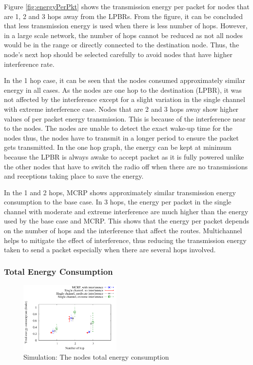 Figure \ref{fig:energyPerPkt} shows the transmission energy per packet for nodes that are 1, 2 and 3 hops away from the LPBRs. From the figure, it can be concluded that less transmission energy is used when there is less number of hops. However, in a large scale network, the number of hops cannot be reduced as not all nodes would be in the range or directly connected to the destination node. Thus, the node's next hop should be selected carefully to avoid nodes that have higher interference rate.

In the 1 hop case, it can be seen that the nodes consumed approximately similar energy in all cases. As the nodes are one hop to the destination (LPBR), it was not affected by the interference except for a slight variation in the single channel with extreme interference case. 
Nodes that are 2 and 3 hops away show higher values of per packet energy transmission.
This is because of the interference near to the nodes. The nodes are unable to detect the exact wake-up time for the nodes thus, the nodes have to transmit in a longer period to ensure the packet gets transmitted. In the one hop graph, the energy can be kept at minimum because the LPBR is always awake to accept packet as it is fully powered unlike the other nodes that have to switch the radio off when there are no transmissions and receptions taking place to save the energy.

In the 1 and 2 hops, MCRP shows approximately similar transmission energy consumption to the base case. 
In 3 hops, the energy per packet in the single channel with moderate and extreme interference are much higher than the energy used by the base case and MCRP. This shows that the energy per packet depends on the number of hops and the interference that affect the routes. Multichannel helps to mitigate the effect of interference, thus reducing the transmission energy taken to send a packet especially when there are several hops involved.

\subsubsection{Total Energy Consumption}

\begin{figure}
\centering
\includegraphics[width=0.45\textwidth]{figures/totalEnergy.pdf}
\caption{Simulation: The nodes total energy consumption}
\label{fig:allNodesEnergy}
\end{figure}

